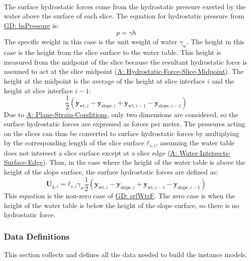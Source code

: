 \documentclass[12pt]{article}
\begin{document}
\paragraph{}
\label{GD:srfWtrFDeriv}
The surface hydrostatic forces come from the hydrostatic pressure exerted by the water above the surface of each slice. The equation for hydrostatic pressure from \hyperref[GD:hsPressure]{GD: hsPressure} is:
\begin{displaymath}
p=γ h
\end{displaymath}
The specific weight in this case is the unit weight of water ${γ_{w}}$. The height in this case is the height from the slice surface to the water table. This height is measured from the midpoint of the slice because the resultant hydrostatic force is assumed to act at the slice midpoint (\hyperref[assumpHFSM]{A: Hydrostatic-Force-Slice-Midpoint}). The height at the midpoint is the average of the height at slice interface $i$ and the height at slice interface $i-1$:
\begin{displaymath}
\frac{1}{2} \left({\mathbf{y}_{\text{wt},i}}-{\mathbf{y}_{\text{slope},i}}+{\mathbf{y}_{\text{wt},i-1}}-{\mathbf{y}_{\text{slope},i-1}}\right)
\end{displaymath}
Due to \hyperref[assumpPSC]{A: Plane-Strain-Conditions}, only two dimensions are considered, so the surface hydrostatic forces are expressed as forces per meter. The pressures acting on the slices can thus be converted to surface hydrostatic forces by multiplying by the corresponding length of the slice surface ${\mathbf{ℓ}_{s,i}}$, assuming the water table does not intersect a slice surface except at a slice edge (\hyperref[assumpWISE]{A: Water-Intersects-Surface-Edge}). Thus, in the case where the height of the water table is above the height of the slope surface, the surface hydrostatic forces are defined as:
\begin{displaymath}
{\mathbf{U}_{\text{g},i}}={\mathbf{ℓ}_{s,i}} {γ_{w}} \frac{1}{2} \left({\mathbf{y}_{\text{wt},i}}-{\mathbf{y}_{\text{slope},i}}+{\mathbf{y}_{\text{wt},i-1}}-{\mathbf{y}_{\text{slope},i-1}}\right)
\end{displaymath}
This equation is the non-zero case of \hyperref[GD:srfWtrF]{GD: srfWtrF}. The zero case is when the height of the water table is below the height of the slope surface, so there is no hydrostatic force.
\subsubsection{Data Definitions}
\label{Sec:DDs}
This section collects and defines all the data needed to build the instance models.
\par~
\end{document}
